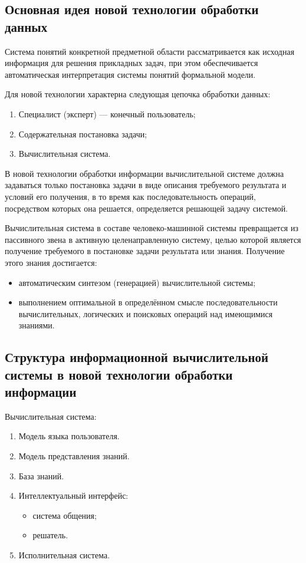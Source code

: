 \documentclass[a4paper,12pt]{report}
\begin{document}
\subsection{Основная идея новой технологии обработки данных}

	Система понятий конкретной предметной области рассматривается как исходная
	информация для решения прикладных задач, при этом обеспечивается
	автоматическая интерпретация системы понятий формальной модели.\par
	Для новой технологии характерна следующая цепочка обработки данных:
	\begin{enumerate}
		\item Специалист (эксперт) — конечный пользователь;
		\item Содержательная постановка задачи;
		\item Вычислительная система.
	\end{enumerate}
	В новой технологии обработки информации вычислительной системе должна
	задаваться только постановка задачи в виде описания требуемого результата и
	условий его получения, в то время как последовательность операций,
	посредством которых она решается, определяется решающей задачу системой.\par
	Вычислительная система в составе человеко-машинной системы превращается из
	пассивного звена в активную целенаправленную систему, целью которой является
	получение требуемого в постановке задачи результата или знания. Получение
	этого знания достигается:
	\begin{itemize}
		\item автоматическим синтезом (генерацией) вычислительной системы;
		\item выполнением оптимальной в определённом смысле последовательности
			вычислительных, логических и поисковых операций над имеющимися знаниями.
	\end{itemize}


\subsection{Структура информационной вычислительной системы в новой
	технологии обработки информации}

	Вычислительная система:
	\begin{enumerate}
		\item Модель языка пользователя.
		\item Модель представления знаний.
		\item База знаний.
		\item Интеллектуальный интерфейс:
			\begin{itemize}
				\item система общения;
				\item решатель.
			\end{itemize}
		\item Исполнительная система.
	\end{enumerate}
\end{document}

